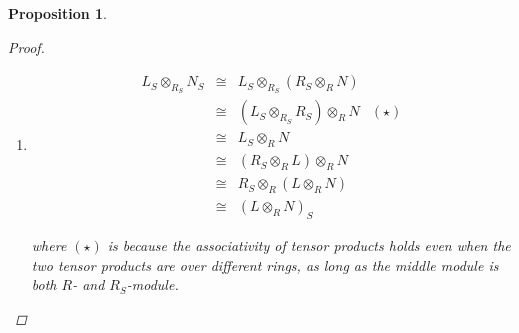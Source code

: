 \documentclass[a4paper]{article}
\theoremstyle{mystyle}
\newtheorem{prop}{Proposition}
\begin{document}
\begin{prop}
\begin{proof}
\begin{enumerate}
      \item 
        \[
          \begin{array}{cclc}
            L_S \otimes_{R_S} N_S
            &\cong& L_S \otimes_{R_S} (R_S \otimes_R N) &\\
            &\cong& (L_S \otimes_{R_S} R_S) \otimes_R N &(\star) \\
            &\cong& L_S \otimes_R N &\\
            &\cong& (R_S \otimes_R L) \otimes_R N &\\
            &\cong& R_S \otimes_R (L \otimes_R N) &\\
            &\cong& (L \otimes_R N)_S &
          \end{array}
        \]

        where $(\star)$ is because the associativity of tensor products
        holds even when the two tensor products are over different rings, 
        as long as the middle module is both $R$- and $R_S$-module.

    \end{enumerate}
  \end{proof}
\end{prop}

% 
% 
\end{document}
